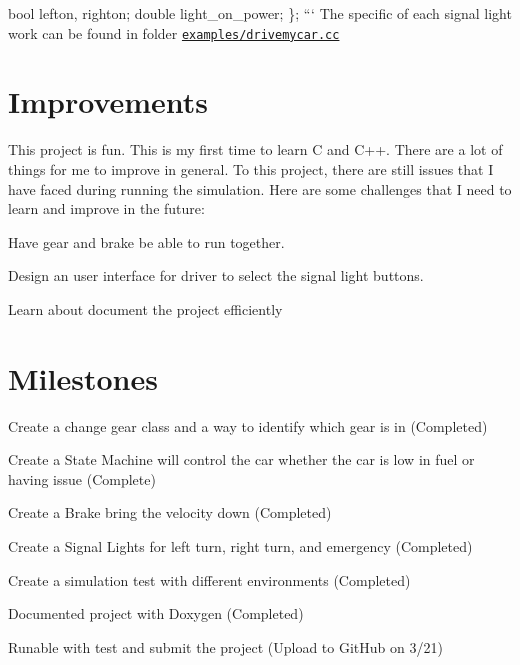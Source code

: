bool lefton, righton; double light\+\_\+on\+\_\+power; \}; ``` The specific of each signal light work can be found in folder \href{https://github.com/hoaibaonguyen/project_drivingmycar590/tree/master/examples}{\tt examples/drivemycar.\+cc}

\section*{Improvements }

This project is fun. This is my first time to learn C and C++. There are a lot of things for me to improve in general. To this project, there are still issues that I have faced during running the simulation. Here are some challenges that I need to learn and improve in the future\+:
\begin{DoxyItemize}
\item Have gear and brake be able to run together.
\item Design an user interface for driver to select the signal light buttons.
\item Learn about document the project efficiently
\end{DoxyItemize}

\section*{Milestones }


\begin{DoxyItemize}
\item Create a change gear class and a way to identify which gear is in (Completed)
\item Create a State Machine will control the car whether the car is low in fuel or having issue (Complete)
\item Create a Brake bring the velocity down (Completed)
\item Create a Signal Lights for left turn, right turn, and emergency (Completed)
\item Create a simulation test with different environments (Completed)
\item Documented project with Doxygen (Completed)
\item Runable with test and submit the project (Upload to Git\+Hub on 3/21) 
\end{DoxyItemize}